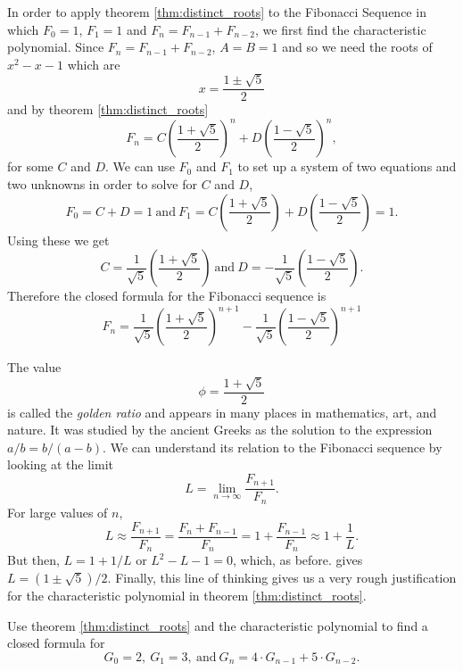 \begin{exposition}
In order to apply theorem \ref{thm:distinct_roots} to the Fibonacci Sequence in which \(F_0=1\), \(F_1=1\) and \(F_n=F_{n-1}+F_{n-2}\), we first find the characteristic polynomial.  Since \(F_n=F_{n-1}+F_{n-2}\), \(A=B=1\) and so we need the roots of \(x^2-x-1\) which are
    \[x=\frac{1\pm\sqrt{5}}{2}\] and by theorem \ref{thm:distinct_roots}
    \[F_n=C\left(\frac{1+\sqrt{5}}{2}\right)^n+D\left(\frac{1-\sqrt{5}}{2}\right)^n,\]
for some \(C\) and \(D\).  We can use \(F_0\) and \(F_1\) to set up a system of two equations and two unknowns in order to solve for \(C\) and \(D\),
    \begin{equation*}
        F_0=C+D=1\ \text{and}\ F_1=C\left(\frac{1+\sqrt{5}}{2}\right)+D\left(\frac{1-\sqrt{5}}{2}\right)=1.
    \end{equation*}
Using these we get
    \[C=\frac{1}{\sqrt{5}}\left(\frac{1+\sqrt{5}}{2}\right)\ \text{and}\ D=-\frac{1}{\sqrt{5}}\left(\frac{1-\sqrt{5}}{2}\right).\]
Therefore the closed formula for the Fibonacci sequence is
    \[F_n=\frac{1}{\sqrt{5}}\left(\frac{1+\sqrt{5}}{2}\right)^{n+1}-\frac{1}{\sqrt{5}}\left(\frac{1-\sqrt{5}}{2}\right)^{n+1}\]
\end{exposition}

\begin{note}
    The value \[\phi=\frac{1+\sqrt{5}}{2}\] is called the \emph{golden ratio} and appears in many places in mathematics, art, and nature.  It was studied by the ancient Greeks as the solution to the expression \(a/b=b/(a-b)\).  We can understand its relation to the Fibonacci sequence by looking at the limit
        \[L=\lim_{n\rightarrow\infty}\frac{F_{n+1}}{F_n}.\]
    For large values of \(n\), 
        \[L\approx\frac{F_{n+1}}{F_n}=\frac{F_n+F_{n-1}}{F_n}=1+\frac{F_{n-1}}{F_n}\approx 1+\frac{1}{L}.\]
    But then, \(L=1+1/L\) or \(L^2-L-1=0\), which, as before. gives \(L=\left(1\pm\sqrt{5}\right)/2\).
    Finally, this line of thinking gives us a very rough justification for the characteristic polynomial in theorem \ref{thm:distinct_roots}.
\end{note}


\clearpage

\begin{practiceprob}
Use theorem \ref{thm:distinct_roots} and the characteristic polynomial to find a closed formula for \[G_0=2,\ G_1=3,\ \text{and}\ G_n=4\cdot G_{n-1}+5\cdot G_{n-2}.\]
\vspace{0.85\textheight}
\end{practiceprob}

